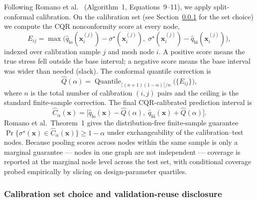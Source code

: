 \documentclass[11pt]{article}
\begin{document}
Following Romano et al.~\cite{romano2019cqr} (Algorithm~1, Equations~9--11),
we apply split-conformal calibration. On the calibration set (see
Section~\ref{ssec:cqr-calib} for the set choice) we compute the CQR
nonconformity score at every node,
\begin{equation}
  E_{ij} = \max\!\bigl(
    \hat{q}_{\text{lo}}(\mathbf{x}_i^{(j)}) - \sigma^\star(\mathbf{x}_i^{(j)}),\;
    \sigma^\star(\mathbf{x}_i^{(j)}) - \hat{q}_{\text{hi}}(\mathbf{x}_i^{(j)})
  \bigr),
\end{equation}
indexed over calibration sample $j$ and mesh node $i$. A positive score
means the true stress fell outside the base interval; a negative score
means the base interval was wider than needed (slack). The conformal
quantile correction is
\begin{equation}
  \hat{Q}(\alpha) = \operatorname{Quantile}_{\lceil (n+1)(1-\alpha)\rceil / n}
    \bigl( \{E_{ij}\} \bigr),
  \label{eq:qhat}
\end{equation}
where $n$ is the total number of calibration $(i,j)$ pairs and the ceiling
is the standard finite-sample correction. The final CQR-calibrated
prediction interval is
\begin{equation}
  \hat{C}_\alpha(\mathbf{x}) = \bigl[
    \hat{q}_{\text{lo}}(\mathbf{x}) - \hat{Q}(\alpha),\;
    \hat{q}_{\text{hi}}(\mathbf{x}) + \hat{Q}(\alpha)
  \bigr].
  \label{eq:cqr-interval}
\end{equation}
Romano et al.\ Theorem~1 gives the distribution-free finite-sample
guarantee
$\Pr\{\sigma^\star(\mathbf{x}) \in \hat{C}_\alpha(\mathbf{x})\} \geq 1-\alpha$
under exchangeability of the calibration--test nodes. Because pooling scores
across nodes within the same sample is only a marginal guarantee --- nodes
in one graph are not independent --- coverage is reported at the marginal
node level across the test set, with conditional coverage probed
empirically by slicing on design-parameter quartiles.

\subsubsection{Calibration set choice and validation-reuse disclosure}
\label{ssec:cqr-calib}
\end{document}
